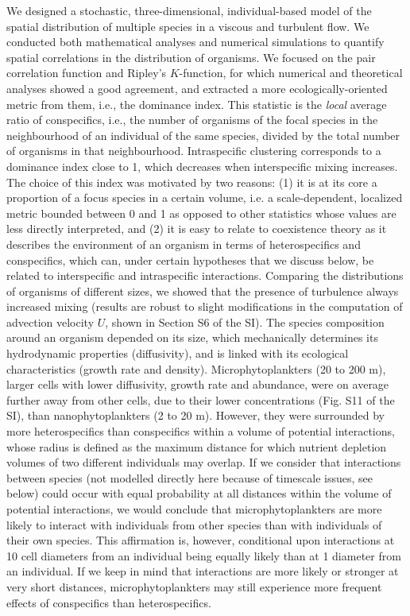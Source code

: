 \documentclass[12pt,english]{article}
\begin{document}
We designed a stochastic, three-dimensional, individual-based model
of the spatial distribution of multiple species in a viscous and turbulent
flow. We conducted both mathematical analyses and numerical simulations
to quantify spatial correlations in the distribution of organisms.
We focused on the pair correlation function and Ripley's $K$-function,
for which numerical and theoretical analyses showed a good agreement,
and extracted a more ecologically-oriented metric from them, i.e.,
the dominance index. This statistic is the \textit{local} average
ratio of conspecifics, i.e., the number of organisms of the focal
species in the neighbourhood of an individual of the same species,
divided by the total number of organisms in that neighbourhood. Intraspecific
clustering corresponds to a dominance index close to 1, which decreases
when interspecific mixing increases. The choice of this index was
motivated by two reasons: (1) it is at its core a proportion of a
focus species in a certain volume, i.e. a scale-dependent, localized
metric bounded between 0 and 1 as opposed to other statistics whose
values are less directly interpreted, and (2) it is easy to relate
to coexistence theory as it describes the environment of an organism
in terms of heterospecifics and conspecifics, which can, under certain
hypotheses that we discuss below, be related to interspecific and
intraspecific interactions. Comparing the distributions of organisms
of different sizes, we showed that the presence of turbulence always
increased mixing (results are robust to slight modifications in the
computation of advection velocity $U$, shown in Section S6 of the
SI). The species composition around an organism depended on its size,
which mechanically determines its hydrodynamic properties (diffusivity),
and is linked with its ecological characteristics (growth rate and
density). Microphytoplankters (20 to 200 \textmu m), larger cells
with lower diffusivity, growth rate and abundance, were on average
further away from other cells, due to their lower concentrations (Fig.
S11 of the SI), than nanophytoplankters (2 to 20 \textmu m). However,
they were surrounded by more heterospecifics than conspecifics within
a volume of potential interactions, whose radius is defined as the
maximum distance for which nutrient depletion volumes of two different
individuals may overlap. If we consider that interactions between
species (not modelled directly here because of timescale issues, see
below) could occur with equal probability at all distances within
the volume of potential interactions, we would conclude that microphytoplankters
are more likely to interact with individuals from other species than
with individuals of their own species. This affirmation is, however,
conditional upon interactions at 10 cell diameters from an individual
being equally likely than at 1 diameter from an individual. If we
keep in mind that interactions are more likely or stronger at very
short distances, microphytoplankters may still experience more frequent
effects of conspecifics than heterospecifics.
\end{document}
